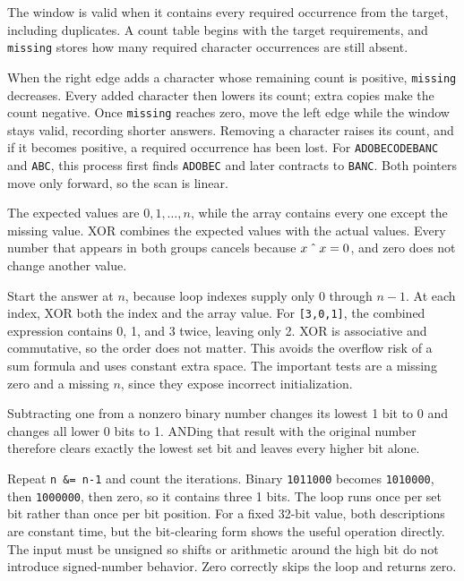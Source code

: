 \expandafter\def\csname sourcewalkthrough@47\endcsname{%
The window is valid when it contains every required occurrence from the target,
including duplicates. A count table begins with the target requirements, and
\texttt{missing} stores how many required character occurrences are still
absent.

When the right edge adds a character whose remaining count is positive,
\texttt{missing} decreases. Every added character then lowers its count; extra
copies make the count negative. Once \texttt{missing} reaches zero, move the
left edge while the window stays valid, recording shorter answers. Removing a
character raises its count, and if it becomes positive, a required occurrence
has been lost. For \texttt{ADOBECODEBANC} and \texttt{ABC}, this process first
finds \texttt{ADOBEC} and later contracts to \texttt{BANC}. Both pointers move
only forward, so the scan is linear.}

\expandafter\def\csname sourcewalkthrough@48\endcsname{%
The expected values are \(0,1,\ldots,n\), while the array contains every one
except the missing value. XOR combines the expected values with the actual
values. Every number that appears in both groups cancels because
\(x\mathbin{\char94}x=0\), and zero does not change another value.

Start the answer at \(n\), because loop indexes supply only 0 through
\(n-1\). At each index, XOR both the index and the array value. For
\texttt{[3,0,1]}, the combined expression contains 0, 1, and 3 twice, leaving
only 2. XOR is associative and commutative, so the order does not matter.
This avoids the overflow risk of a sum formula and uses constant extra space.
The important tests are a missing zero and a missing \(n\), since they expose
incorrect initialization.}

\expandafter\def\csname sourcewalkthrough@49\endcsname{%
Subtracting one from a nonzero binary number changes its lowest 1 bit to 0 and
changes all lower 0 bits to 1. ANDing that result with the original number
therefore clears exactly the lowest set bit and leaves every higher bit alone.

Repeat \texttt{n \&= n-1} and count the iterations. Binary
\texttt{1011000} becomes \texttt{1010000}, then \texttt{1000000}, then zero,
so it contains three 1 bits. The loop runs once per set bit rather than once
per bit position. For a fixed 32-bit value, both descriptions are constant
time, but the bit-clearing form shows the useful operation directly. The input
must be unsigned so shifts or arithmetic around the high bit do not introduce
signed-number behavior. Zero correctly skips the loop and returns zero.}